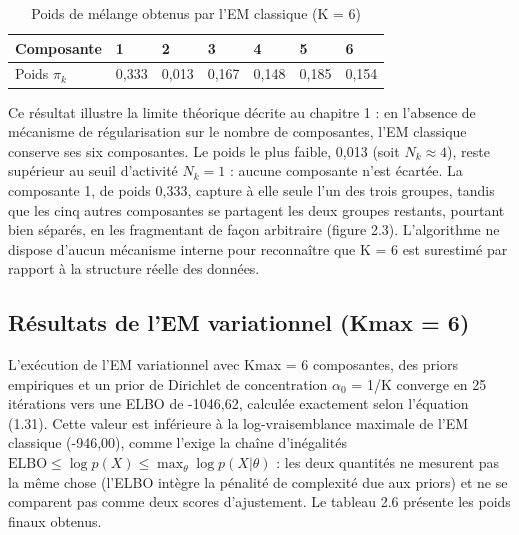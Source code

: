 \begin{table}[H]
\centering
\small
\setlength{\tabcolsep}{0.09cm}
\begin{tabular}{|p{1.98cm}|p{1.98cm}|p{1.98cm}|p{1.98cm}|p{1.98cm}|p{1.98cm}|p{1.98cm}|}
\hline
\textbf{Composante} & \textbf{1} & \textbf{2} & \textbf{3} & \textbf{4} & \textbf{5} & \textbf{6} \\
\hline
Poids $\pi _{k}$ & 0,333 & 0,013 & 0,167 & 0,148 & 0,185 & 0,154 \\
\hline
\end{tabular}
\caption{Poids de mélange obtenus par l'EM classique (K = 6)}
\label{tab:2_5}
\end{table}
Ce résultat illustre la limite théorique décrite au chapitre 1 : en l'absence de mécanisme de régularisation sur le nombre de composantes, l'EM classique conserve ses six composantes. Le poids le plus faible, 0,013 (soit $N_{k} \approx 4$), reste supérieur au seuil d'activité $N_{k} = 1$ : aucune composante n'est écartée. La composante 1, de poids 0,333, capture à elle seule l'un des trois groupes, tandis que les cinq autres composantes se partagent les deux groupes restants, pourtant bien séparés, en les fragmentant de façon arbitraire (figure 2.3). L'algorithme ne dispose d'aucun mécanisme interne pour reconnaître que K = 6 est surestimé par rapport à la structure réelle des données.

\subsection{Résultats de l'EM variationnel (Kmax = 6)}
L'exécution de l'EM variationnel avec Kmax = 6 composantes, des priors empiriques et un prior de Dirichlet de concentration $\alpha _{0}$ = 1/K converge en 25 itérations vers une ELBO de -1046,62, calculée exactement selon l'équation (1.31). Cette valeur est inférieure à la log-vraisemblance maximale de l'EM classique (-946,00), comme l'exige la chaîne d'inégalités $\mathrm{ELBO} \leq \log p(X) \leq \max _{\theta } \log p(X|\theta )$ : les deux quantités ne mesurent pas la même chose (l'ELBO intègre la pénalité de complexité due aux priors) et ne se comparent pas comme deux scores d'ajustement. Le tableau 2.6 présente les poids finaux obtenus.

